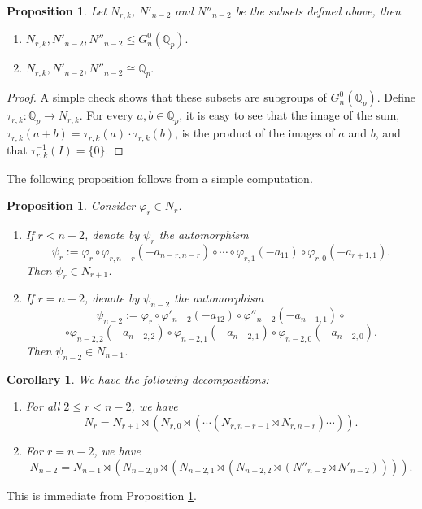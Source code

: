 \documentclass{article}
\newtheorem{proposition}[theorem]{Proposition}
\newtheorem{proposition2}[theorem2]{Proposition}
\newtheorem{corollary2}[theorem2]{Corollary}
\begin{document}
\begin{proposition}
Let $N_{r,k}$, $N'_{n-2}$ and $N''_{n-2}$ be the subsets defined above, then
\begin{enumerate}
    \item $N_{r,k},N'_{n-2},N''_{n-2}\leq{G_{n}^{0}(\mathbb{Q}_{p})}.$
    \item $N_{r,k},N'_{n-2},N''_{n-2}\cong{\mathbb{Q}_{p}}.$
\end{enumerate}
\end{proposition}
\begin{proof}
A simple check shows that these subsets are subgroups of $G_{n}^{0}(\mathbb{Q}_p)$. Define $\tau_{r,k}:\mathbb{Q}_{p}\rightarrow{N_{r,k}}$. For every $a,b\in\mathbb{Q}_{p}$, it is easy to see that the image of the sum, $\tau_{r,k}(a+b)=\tau_{r,k}(a)\cdot\tau_{r,k}(b)$, is the product of the images of $a$ and $b$, and that $\tau_{r,k}^{-1}(I)=\{0\}$.
\end{proof}
The following proposition follows from a simple computation.
\begin{proposition2}
\label{prop:psi.automorphism}
Consider $\varphi_{r}\in{N_{r}}$.
\begin{enumerate}
    \item 
If $r<n-2$, denote by $\psi_{r}$ the automorphism \[\psi_{r}:=\varphi_{r}\circ\varphi_{r,n-r}(-a_{n-r,n-r})\circ\cdots\circ\varphi_{r,1}(-a_{11})\circ\varphi_{r,0}(-a_{r+1,1}).\]
Then $\psi_{r}\in{N_{r+1}}$.
    \item 
If $r=n-2$, denote by $\psi_{n-2}$ the automorphism \[\psi_{n-2}:=\varphi_{r}\circ\varphi'_{n-2}(-a_{12})\circ\varphi''_{n-2}(-a_{n-1,1})\circ\]\[\circ\varphi_{n-2,2}(-a_{n-2,2})\circ\varphi_{n-2,1}(-a_{n-2,1})\circ\varphi_{n-2,0}(-a_{n-2,0}).\]
Then $\psi_{n-2}\in{N_{n-1}}$.
\end{enumerate}
\end{proposition2}
\begin{corollary2}
\label{cor:Nr.decomposition}
We have the following decompositions:
\begin{enumerate}
    \item 
For all $2\leq{r}<{n-2}$, we have \[N_{r}=N_{r+1}\rtimes(N_{r,0}\rtimes(\cdots(N_{r,n-r-1}\rtimes{N_{r,n-r}})\cdots)).\]
\item For $r=n-2$, we have 
\[N_{n-2}=N_{n-1}\rtimes({N_{n-2,0}}\rtimes(N_{n-2,1}\rtimes(N_{n-2,2}\rtimes(N''_{n-2}\rtimes{N'_{n-2}})))).\]
\end{enumerate}
\end{corollary2}
This is immediate from Proposition \ref{prop:psi.automorphism}.
\end{document}
